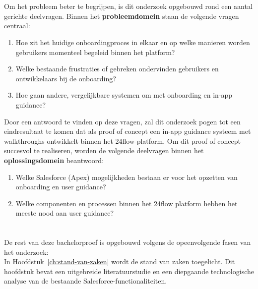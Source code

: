\section{}%
\label{sec:onderzoeksdoelstelling}

Om het probleem beter te begrijpen, is dit onderzoek opgebouwd rond een aantal gerichte deelvragen. Binnen het \textbf{probleemdomein} staan de volgende vragen centraal:

\begin{enumerate}
	\item Hoe zit het huidige onboardingproces in elkaar en op welke manieren worden gebruikers momenteel begeleid binnen het platform?
	\item Welke bestaande frustraties of gebreken ondervinden gebruikers en ontwikkelaars bij de onboarding?
	\item Hoe gaan andere, vergelijkbare systemen om met onboarding en in-app guidance?
\end{enumerate}

Door een antwoord te vinden op deze vragen, zal dit onderzoek pogen tot een eindresultaat te komen dat als proof of concept een in-app guidance systeem met walkthroughs ontwikkelt binnen het 24flow-platform. Om dit proof of concept succesvol te realiseren, worden de volgende deelvragen binnen het \textbf{oplossingsdomein} beantwoord:

\begin{enumerate}
	\item Welke Salesforce (Apex) mogelijkheden bestaan er voor het opzetten van onboarding en user guidance?
	\item Welke componenten en processen binnen het 24flow platform hebben het meeste nood aan user guidance?
\end{enumerate}
\section{}%
\label{sec:opzet-bachelorproef}

De rest van deze bachelorproef is opgebouwd volgens de opeenvolgende fasen van het onderzoek:
\\

In Hoofdstuk~\ref{ch:stand-van-zaken} wordt de stand van zaken toegelicht. Dit hoofdstuk bevat een uitgebreide literatuurstudie en een diepgaande technologische analyse van de bestaande Salesforce-functionaliteiten.
\\

